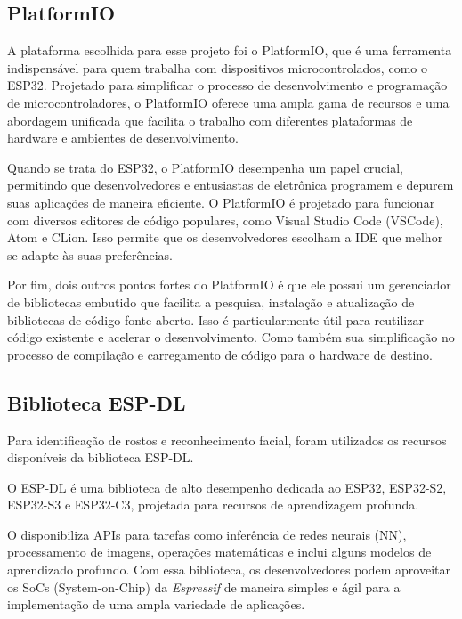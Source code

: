 \subsection{PlatformIO}\label{sec:platformio}

A plataforma escolhida para esse projeto foi o PlatformIO, 
que é uma ferramenta indispensável para quem trabalha com dispositivos 
microcontrolados, como o ESP32. Projetado para simplificar o processo 
de desenvolvimento e programação de microcontroladores, o PlatformIO 
oferece uma ampla gama de recursos e uma abordagem unificada que 
facilita o trabalho com diferentes plataformas de hardware e 
ambientes de desenvolvimento.

Quando se trata do ESP32, o PlatformIO desempenha 
um papel crucial, permitindo que desenvolvedores e entusiastas de 
eletrônica programem e depurem suas aplicações de maneira eficiente.
O PlatformIO é projetado para funcionar com diversos editores de 
código populares, como Visual Studio Code (VSCode), Atom e CLion. 
Isso permite que os desenvolvedores escolham a IDE que melhor 
se adapte às suas preferências.

Por fim, dois outros pontos fortes do PlatformIO é que ele 
possui um gerenciador de bibliotecas embutido que facilita a 
pesquisa, instalação e atualização de bibliotecas de código-fonte 
aberto. Isso é particularmente útil para reutilizar código 
existente e acelerar o desenvolvimento. Como também sua 
simplificação no processo de compilação e carregamento de 
código para o hardware de destino. 

\subsection{Biblioteca ESP-DL}\label{sec:formatacaoTexto}

Para identificação de rostos e reconhecimento facial, foram utilizados 
os recursos disponíveis da biblioteca ESP-DL.

O ESP-DL é uma biblioteca de alto desempenho dedicada ao ESP32, ESP32-S2,
ESP32-S3 e ESP32-C3, projetada para recursos de aprendizagem profunda.

O  disponibiliza APIs para tarefas como inferência 
de redes neurais (NN), processamento de imagens, operações matemáticas 
e inclui alguns modelos de aprendizado profundo. Com essa biblioteca, 
os desenvolvedores podem aproveitar os SoCs (System-on-Chip) da 
\textit{Espressif} de maneira simples e ágil para a implementação 
de uma ampla variedade de aplicações.

